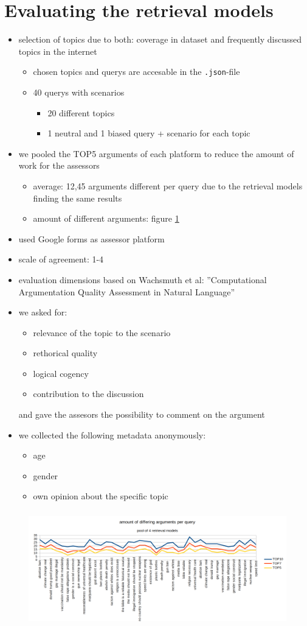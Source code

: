 \documentclass{scrartcl}
\begin{document}
	\section{Evaluating the retrieval models}
	\begin{itemize}
		\item selection of topics due to both: coverage in dataset and frequently discussed topics in the internet
		\begin{itemize}
			\item chosen topics and querys are accesable in the \texttt{.json}-file
			\item 40 querys with scenarios
			\begin{itemize}
				\item 20 different topics
				\item 1 neutral and 1 biased query + scenario for each topic
			\end{itemize}
		\end{itemize}
		\item we pooled the TOP5 arguments of each platform to reduce the amount of work for the assessors
		\begin{itemize}
			\item average: 12,45 arguments different per query due to the retrieval models finding the same results
			\item amount of different arguments: figure \ref{fig:amt_pooled}
		\end{itemize}
		\item used Google forms as assessor platform
		\item scale of agreement: 1-4
		\item evaluation dimensions based on Wachsmuth et al: ''Computational Argumentation Quality Assessment in Natural Language''
		\item we asked for:
		\begin{itemize}
			\item relevance of the topic to the scenario
			\item rethorical quality
			\item logical cogency
			\item contribution to the discussion
		\end{itemize}
		and gave the assesors the possibility to comment on the argument
		\item we collected the following metadata anonymously:
		\begin{itemize}
			\item age
			\item gender
			\item own opinion about the specific topic
		\end{itemize}
	\end{itemize}
	
	\begin{figure}[hpbt]
		\centering
		\includegraphics[height=5cm]{img/args_amt_of_pooled_arguments.png}
		\caption{}
		\label{fig:amt_pooled}
	\end{figure}
	
\end{document}
